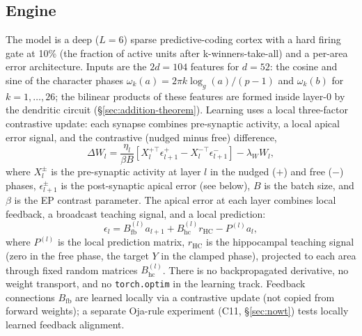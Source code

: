 \documentclass[11pt]{article}
\begin{document}
\subsection{Engine}\label{sec:engine}
The model is a deep ($L=6$) sparse predictive-coding cortex with a hard firing gate at 10\% (the fraction of active units after k-winners-take-all) and a per-area error architecture. Inputs are the $2d = 104$ features for $d = 52$: the cosine and sine of the character phases $\omega_k(a) = 2\pi k \log_g(a)/(p-1)$ and $\omega_k(b)$ for $k = 1, \dots, 26$; the bilinear products of these features are formed inside layer-0 by the dendritic circuit (\S\ref{sec:addition-theorem}). Learning uses a local three-factor contrastive update: each synapse combines pre-synaptic activity, a local apical error signal, and the contrastive (nudged minus free) difference,
\begin{equation}\label{eq:ep}
\Delta W_l = \frac{\eta_l}{\beta B}\left[X_l^{+\top}\epsilon_{l+1}^{+} - X_l^{-\top}\epsilon_{l+1}^{-}\right] - \lambda_W W_l,
\end{equation}
where $X_l^{\pm}$ is the pre-synaptic activity at layer $l$ in the nudged ($+$) and free ($-$) phases, $\epsilon_{l+1}^{\pm}$ is the post-synaptic apical error (see below), $B$ is the batch size, and $\beta$ is the EP contrast parameter. The apical error at each layer combines local feedback, a broadcast teaching signal, and a local prediction:
\[
\epsilon_l = B_{\mathrm{fb}}^{(l)} a_{l+1} + B_{\mathrm{hc}}^{(l)} r_{\mathrm{HC}} - P^{(l)} a_l,
\]
where $P^{(l)}$ is the local prediction matrix, $r_{\mathrm{HC}}$ is the hippocampal teaching signal (zero in the free phase, the target $Y$ in the clamped phase), projected to each area through fixed random matrices $B_{\mathrm{hc}}^{(l)}$. There is no backpropagated derivative, no weight transport, and no \texttt{torch.optim} in the learning track. Feedback connections $B_{\mathrm{fb}}$ are learned locally via a contrastive update (not copied from forward weights); a separate Oja-rule experiment (C11, \S\ref{sec:nowt}) tests locally learned feedback alignment.
\end{document}
